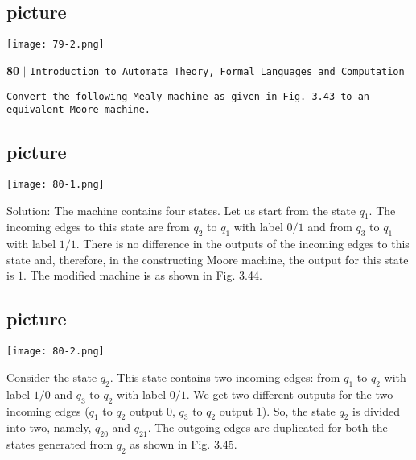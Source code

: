 \documentclass{article}
\begin{document}
\begin{center}
\section{picture}
\texttt{[image: 79-2.png]}
\end{center}

\begin{flushleft}
    \textbf{80}\hspace*{0.1cm} \textbf{$|$} \hspace*{0.1cm} \texttt{Introduction to Automata Theory, Formal Languages and Computation}
  \end{flushleft}

\vspace*{0.5cm}
 \hspace*{0.1cm} \texttt{Convert the following Mealy
machine as given in Fig. 3.43 to
an equivalent Moore machine.}\\

\begin{center}
\section{picture}
\texttt{[image: 80-1.png]}
\end{center}

Solution: The machine contains four states. Let us
start from the state $q_1$. The incoming edges to this
state are from $q_2$ to $q_1$ with label $0/1$ and from $q_3$ to $q_1$
with label $1/1$. There is no difference in the outputs
of the incoming edges to this state and, therefore,
in the constructing Moore machine, the output for
this state is $1$. The modified machine is as shown in
Fig. 3.44.\\

\begin{center}
\section{picture}
\texttt{[image: 80-2.png]}
\end{center}

\hspace*{0.3cm} Consider the state $q_2$. This state contains two
incoming edges: from $q_1$ to $q_2$ with label $1/0$ and $q_3$
to $q_2$ with label $0/1$. We get two different outputs
for the two incoming edges ($q_1$ to $q_2$ output $0$, $q_3$
to $q_2$ output $1$). So, the state $q_2$ is divided into two,
namely, $q_20$ and $q_21$. The outgoing edges are duplicated
for both the states generated from $q_2$ as shown
in Fig. 3.45.\\
\end{document}
